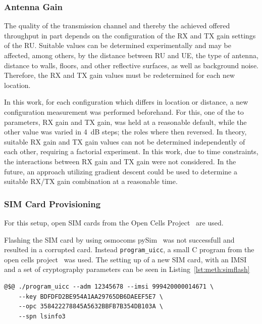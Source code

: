 \subsubsection{Antenna Gain}\label{sec:meth:antennagain}
The quality of the transmission channel and thereby the achieved offered throughput in part depends on the configuration
of the RX and TX gain settings of the \gls{RU}.
Suitable values can be determined experimentally and may be affected, among others, by the distance between \gls{RU}
and \gls{UE}, the type of antenna, distance to walls, floors, and other reflective surfaces, as well as background noise.
Therefore, the RX and TX gain values must be redetermined for each new location.

In this work, for each configuration which differs in location or distance, a new configuration measurement
was performed beforehand.
For this, one of the to parameters, RX gain and TX gain, was held at a reasonable default, while the other value
was varied in \SI{4}{\deci\bel} steps; the roles where then reversed.
In theory, suitable RX gain and TX gain values can not be determined independently of each other,
requiring a factorial experiment.
In this work, due to time constraints, the interactions between RX gain and TX gain were not considered.
In the future, an approach utilizing gradient descent could be used to determine a suitable RX/TX gain combination
at a reasonable time.

\subsubsection{SIM Card Provisioning}

For this setup, open SIM cards from the Open Cells Project~\cite{opencells} are used.

Flashing the SIM card by using osmocoms pySim~\cite{pysim} was not successfull and resulted in a corrupted card.
Instead \texttt{program\_uicc}, a small C program from the open cells project~\cite{opencellssw} was used.
The setting up of a new SIM card, with an \gls{IMSI} and a set of cryptography parameters can be seen in Listing~\ref{lst:meth:simflash}

\begin{lstfloat}[htb]
\begin{lstlisting}[basicstyle={\ttfamily\small\color{black}},style=base,caption={Flashing new IMSI to SIM.},label={lst:meth:simflash}]
@$@ ./program_uicc --adm 12345678 --imsi 999420000014671 \
    --key BDFDFD2BE954A1AA29765DB6DAEEF5E7 \
    --opc 358422278845A5632BBFB7B354DB103A \
    --spn lsinfo3
\end{lstlisting}
\end{lstfloat}


